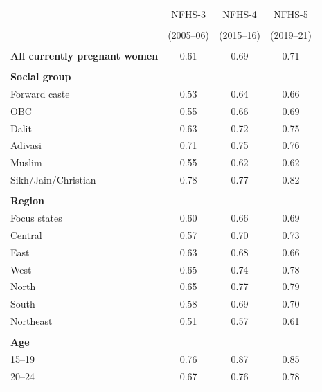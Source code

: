 \begin{tabular}{lccc}
\toprule
 & \multicolumn{1}{c}{NFHS-3} & \multicolumn{1}{c}{NFHS-4} & \multicolumn{1}{c}{NFHS-5} \\\\
 & \multicolumn{1}{c}{(2005--06)} & \multicolumn{1}{c}{(2015--16)} & \multicolumn{1}{c}{(2019--21)} \\\\
\midrule
\textbf{All currently pregnant women}&0.61&0.69&0.71\\
&&&\\
\textbf{Social group}&&&\\
\hspace*{2em}Forward caste&0.53&0.64&0.66\\
\hspace*{2em}OBC&0.55&0.66&0.69\\
\hspace*{2em}Dalit&0.63&0.72&0.75\\
\hspace*{2em}Adivasi&0.71&0.75&0.76\\
\hspace*{2em}Muslim&0.55&0.62&0.62\\
\hspace*{2em}Sikh/Jain/Christian&0.78&0.77&0.82\\
&&&\\
\textbf{Region}&&&\\
\hspace*{2em}Focus states&0.60&0.66&0.69\\
\hspace*{2em}Central&0.57&0.70&0.73\\
\hspace*{2em}East&0.63&0.68&0.66\\
\hspace*{2em}West&0.65&0.74&0.78\\
\hspace*{2em}North&0.65&0.77&0.79\\
\hspace*{2em}South&0.58&0.69&0.70\\
\hspace*{2em}Northeast&0.51&0.57&0.61\\
&&&\\
\textbf{Age}&&&\\
\hspace*{2em}15--19&0.76&0.87&0.85\\
\hspace*{2em}20--24&0.67&0.76&0.78\\

\end{tabular}
